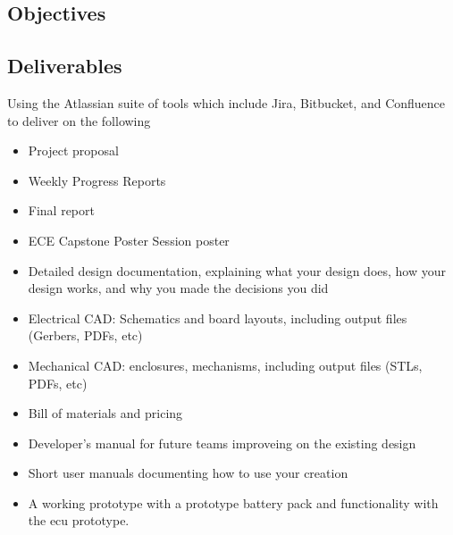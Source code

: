 \subsection{Objectives}


\subsection{Deliverables}

Using the Atlassian suite of tools which include Jira, Bitbucket, and Confluence to deliver on the following

\begin{itemize}
	\item Project proposal
	\item Weekly Progress Reports
	\item Final report
	\item ECE Capstone Poster Session poster
	\item Detailed design documentation, explaining what your design does, how your design works, and why you made the decisions you did
	\item Electrical CAD: Schematics and board layouts, including output files (Gerbers, PDFs, etc)
	\item Mechanical CAD: enclosures, mechanisms, including output files (STLs, PDFs, etc)
	\item Bill of materials and pricing
	\item Developer's manual for future teams improveing on the existing design
	\item Short user manuals documenting how to use your creation
	\item A working prototype with a prototype battery pack and functionality with the \gls{ecu} prototype.
\end{itemize}